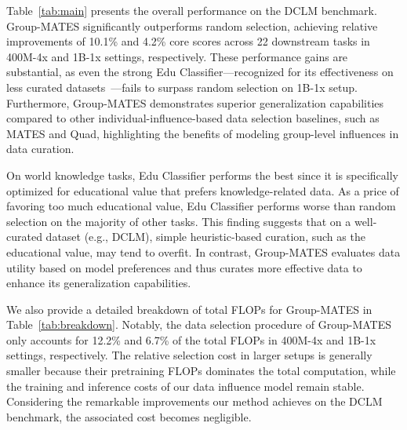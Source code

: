 
Table~\ref{tab:main} presents the overall performance on the DCLM benchmark. 
Group-MATES significantly outperforms random selection, achieving relative improvements of 10.1\% and 4.2\% core scores across 22 downstream tasks in 400M-4x and 1B-1x settings, respectively. 
These performance gains are substantial, as even the strong Edu Classifier—recognized for its effectiveness on less curated datasets~\cite{penedo2024fineweb}—fails to surpass random selection on 1B-1x setup. 
Furthermore, Group-MATES demonstrates superior generalization capabilities compared to other individual-influence-based data selection baselines, such as MATES and Quad, highlighting the benefits of modeling group-level influences in data curation.

On world knowledge tasks, Edu Classifier performs the best since it is specifically optimized for educational value that prefers knowledge-related data. As a price of favoring too much educational value, Edu Classifier performs worse than random selection on the majority of other tasks. This finding suggests that on a well-curated dataset (e.g., DCLM), simple heuristic-based curation, such as the educational value, may tend to overfit. In contrast, Group-MATES evaluates data utility based on model preferences and thus curates more effective data to enhance its generalization capabilities.

We also provide a detailed breakdown of total FLOPs for Group-MATES in Table~\ref{tab:breakdown}. Notably, the data selection procedure of Group-MATES only accounts for 12.2\% and 6.7\% of the total FLOPs in 400M-4x and 1B-1x settings, respectively. The relative selection cost in larger setups is generally smaller because their pretraining FLOPs dominates the total computation, while the training and inference costs of our data influence model remain stable. Considering the remarkable improvements our method achieves on the DCLM benchmark, the associated cost becomes negligible.

